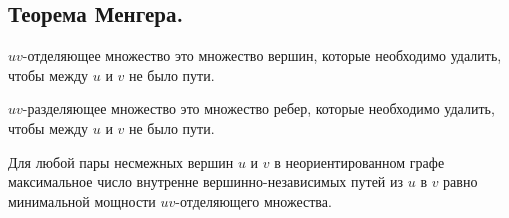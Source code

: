 \subsection{%
  Теорема Менгера.%
}

\begin{definition}
  \(uv\)-отделяющее множество это множество вершин, которые необходимо удалить,
  чтобы между \(u\) и \(v\) не было пути.
\end{definition}

\begin{definition}
  \(uv\)-разделяющее множество это множество ребер, которые необходимо удалить,
  чтобы между \(u\) и \(v\) не было пути.
\end{definition}

\begin{theorem}
  Для любой пары несмежных вершин \(u\) и \(v\) в неориентированном графе
  максимальное число внутренне вершинно-независимых путей из \(u\) в \(v\) равно
  минимальной мощности \(uv\)-отделяющего множества.
\end{theorem}
